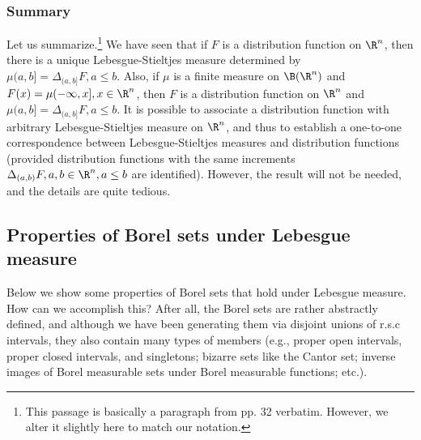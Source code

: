 \documentclass{article} %
\begin{document}
\subsubsection{Summary}

Let us summarize.\footnote{This passage is basically a paragraph from \cite{ash2000probability} pp. 32 verbatim. However, we alter it slightly here to match our notation.} We have seen that if $F$ is a distribution function on $\R^n$, then there is a unique Lebesgue-Stieltjes measure determined by $\mu(a,b] = \Delta_{(a,b]} F, a \leq b$.  Also, if $\mu$ is a finite measure on $\B(\R^n)$ and $F(x) = \mu(-\infty, x], x \in \R^n$, then $F$ is a distribution function on $\R^n$ and $\mu(a,b] =  \Delta_{(a,b]} F, a \leq b$.   It is possible to associate a distribution function with arbitrary Lebesgue-Stieltjes measure on $\R^n$, and thus to establish a one-to-one correspondence between Lebesgue-Stieltjes measures and distribution functions (provided distribution functions with the same increments $\Delta_{(a,b)} F, a,b \in \R^n, a \leq b$ are identified).  However, the result will not be needed, and the details are quite tedious. 



\subsection{Properties of Borel sets under Lebesgue measure} \label{sec:properties_of_borel_sets}

Below we show some properties of Borel sets that hold under Lebesgue measure.  How can we accomplish this?  After all, the Borel sets are rather abstractly defined, and although we have been generating them via disjoint unions of r.s.c intervals, they also contain many types of members (e.g., proper open intervals, proper closed intervals, and singletons; bizarre sets like the Cantor set; inverse images of Borel measurable sets under Borel measurable functions; etc.).
\end{document}
